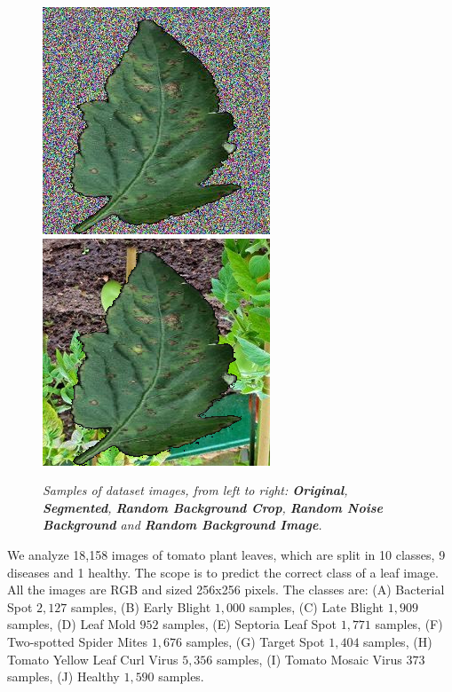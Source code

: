 \begin{figure}
\begin{center}
{			\includegraphics[scale=0.167]{./images/196_ROTATE_270}
			\includegraphics[scale=0.2241]{./images/random_backgorund}
		}
		\begin{center}
			\caption{\textit{Samples of dataset images, from left to right: \textbf{Original}, \textbf{Segmented}, \textbf{Random Background Crop}, \textbf{Random Noise Background} and \textbf{Random Background Image}.}}
			\label{fig:samples}
		\end{center}
		\vspace{-32pt}
	\end{center}
\end{figure}
We analyze 18,158 images of tomato plant leaves, which are split in 10 classes, 9 diseases and 1 healthy. The scope is to predict the correct class of a leaf image. All the images are RGB and sized 256x256 pixels.
The classes are: (A) Bacterial Spot $2,127$ samples, (B) Early Blight $1,000$ samples, (C) Late Blight $1,909$ samples, (D) Leaf Mold  $952$ samples, (E) Septoria Leaf Spot $1,771$ samples, (F) Two-spotted Spider Mites $1,676$ samples, (G) Target Spot $1,404$ samples, (H) Tomato Yellow Leaf Curl Virus $5,356$ samples, (I) Tomato Mosaic Virus $373$ samples, (J) Healthy $1,590$ samples.
\\\indent
